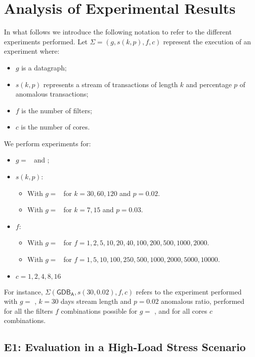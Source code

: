 \newpage
\section{Analysis of Experimental Results}
\label {sec:results}

In what follows we introduce the following notation to refer to the different experiments performed. Let $\Sigma= (g, s(k, p), f, c)$ represent the execution of an experiment where:
\begin{itemize}
    \item $g$ is a datagraph;
    \item $s(k,p)$ represents a stream of transactions of length $k$ and percentage $p$ of anomalous transactions;
    \item $f$ is the number of filters;
    \item $c$ is the number of cores.
\end{itemize}

We perform experiments for: 
\begin{itemize}
    \item $g = $ \smallG\ and \mediumG;
    \item $s(k,p)$: 
    \begin{itemize}
        \item With $g = $ \smallG\ for $k=30, 60, 120$ and $p=0.02$.
        \item With $g = $ \mediumG\ for $k=7, 15$ and $p=0.03$.
    \end{itemize}
    \item $f$: 
    \begin{itemize}
        \item With $g = $ \smallG\ for $f=1,2,5,10,20,40,100,200,500,1000,2000$.
        \item With $g = $ \mediumG\ for $f=1,5,10,100,250,500,1000,2000,5000,10000$.
    \end{itemize} 
    \item $c = 1, 2, 4, 8, 16$
\end{itemize}

For instance, $\Sigma(\mathsf{GDB_A}, s(30, 0.02), f, c)$ refers to the experiment performed with $g = $ \smallG, $k=30$ days stream length and $p=0.02$ anomalous ratio, performed for all the filters $f$ combinations possible for $g = $ \smallG, and for all cores $c$ combinations.\\

\subsection*{E1: Evaluation in a High-Load Stress Scenario}

